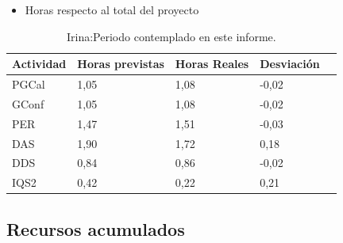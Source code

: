 \begin{itemize}
\item Horas respecto al total del proyecto
\end{itemize}
\begin{table}[H]
\begin{center}
\begin{tabular}{ l l l l l }
  Actividad & Horas previstas & Horas Reales & Desviación \\ \hline \hline
PGCal	&	1,05	&	1,08	&	-0,02	\\ \hline
GConf	&	1,05	&	1,08	&	-0,02	\\ \hline
PER	&	1,47	&	1,51	&	-0,03	\\ \hline
DAS	&	1,90	&	1,72	&	0,18	\\ \hline
DDS	&	0,84	&	0,86	&	-0,02	\\ \hline
IQS2	&	0,42	&	0,22	&	0,21	\\ \hline
\end{tabular}
\caption{Irina:Periodo contemplado en este informe.}
\label{tab:Irina:PeriodoContempladoInforme_2}
\end{center}
\end{table}

\newpage


\subsection{Recursos acumulados}

